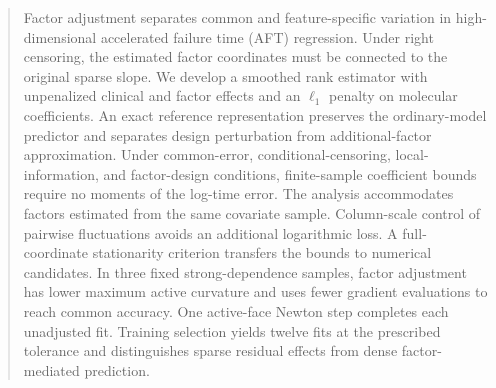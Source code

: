 \begin{abstract}
Factor adjustment separates common and feature-specific variation in high-dimensional accelerated failure time (AFT) regression. Under right censoring, the estimated factor coordinates must be connected to the original sparse slope. We develop a smoothed rank estimator with unpenalized clinical and factor effects and an $\ell_1$ penalty on molecular coefficients. An exact reference representation preserves the ordinary-model predictor and separates design perturbation from additional-factor approximation. Under common-error, conditional-censoring, local-information, and factor-design conditions, finite-sample coefficient bounds require no moments of the log-time error. The analysis accommodates factors estimated from the same covariate sample. Column-scale control of pairwise fluctuations avoids an additional logarithmic loss. A full-coordinate stationarity criterion transfers the bounds to numerical candidates. In three fixed strong-dependence samples, factor adjustment has lower maximum active curvature and uses fewer gradient evaluations to reach common accuracy. One active-face Newton step completes each unadjusted fit. Training selection yields twelve fits at the prescribed tolerance and distinguishes sparse residual effects from dense factor-mediated prediction.
\end{abstract}

